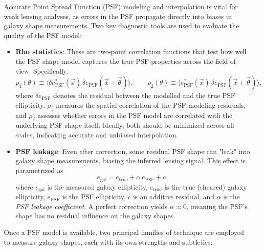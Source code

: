 \smallskip

Accurate Point Spread Function (PSF) modeling and interpolation is vital for weak lensing analyses, as errors in the PSF propagate directly into biases in galaxy shape measurements. Two key diagnostic tools are used to evaluate the quality of the PSF model:

\begin{itemize}
    \item \textbf{Rho statistics}: These are two-point correlation functions that test how well the PSF shape model captures the true PSF properties across the field of view. Specifically,
    \medskip
    $$
    \rho_1(\theta) \equiv \big\langle \delta e^*_{\text{PSF}}(\vec x)\,\delta e_{\text{PSF}}(\vec x+\vec\theta)\big\rangle,\qquad
    \rho_2(\theta) \equiv \big\langle e^*_{\text{PSF}}(\vec x)\,\delta e_{\text{PSF}}(\vec x+\vec\theta)\big\rangle,
    $$
    where $\delta e_{\text{PSF}}$ denotes the residual between the modelled and the true PSF ellipticity. $\rho_1$ measures the spatial correlation of the PSF modeling residuals, and $\rho_2$ assesses whether errors in the PSF model are correlated with the underlying PSF shape itself. Ideally, both should be minimized across all scales, indicating accurate and unbiased interpolation.
    
    \item \textbf{PSF leakage}: Even after correction, some residual PSF shape can "leak" into galaxy shape measurements, biasing the inferred lensing signal. This effect is parametrized as
    \medskip
    $$
    e_{\text{gal}} = e_{\text{true}} + \alpha\, e_{\text{PSF}} + c,
    $$
    where $e_{\text{gal}}$ is the measured galaxy ellipticity, $e_{\text{true}}$ is the true (sheared) galaxy ellipticity, $e_{\text{PSF}}$ is the PSF ellipticity, $c$ is an additive residual, and $\alpha$ is the \textit{PSF leakage coefficient}. A perfect correction yields $\alpha \approx 0$, meaning the PSF's shape has no residual influence on the galaxy shapes.
\end{itemize}

\smallskip

Once a PSF model is available, two principal families of technique are employed to measure galaxy shapes, each with its own strengths and subtleties:

\smallskip

